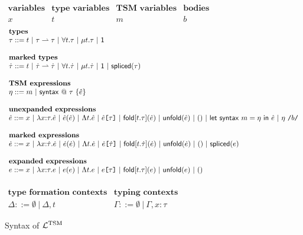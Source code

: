 \begin{figure}$\begin{array}{llllll}
\textbf{variables} & \textbf{type variables} & \textbf{TSM variables} & \textbf{bodies}\\
x & t & m & b\\~\end{array}$\\
$\begin{array}{l}
\textbf{types}\\
\tau ::= t ~\vert~ \parr{\tau}{\tau} ~\vert~ \forallt{t}{\tau} ~\vert~ \rect{t}{\tau} ~\vert~ \unitt\\
~\\
\textbf{marked types}\\
\mtau ::= t ~\vert~ \parr{\mtau}{\mtau} ~\vert~ \forallt{t}{\mtau} ~\vert~ \rect{t}{\mtau} ~\vert~ \unitt ~\vert~ \mtspliced{\tau}\\
~\\
\textbf{TSM expressions}\\
\tsme ::= \tsmv ~\vert~ \utsmdef{\tau}{\ue}
\\~\\
\textbf{unexpanded expressions}\\
\ue ::= {x} ~\vert~ \lam{x}{\tau}{\ue} ~\vert~ \ue(\ue) ~\vert~ \Lam{t}{\ue} ~\vert~ \App{\ue}{\tau} ~\vert~ \fold{t}{\tau}{\ue} ~\vert~ \unfold{\ue} ~\vert~ \triv ~\vert~ \uletsyntax{\tsmv}{\tsme}{\ue} ~\vert~ \utsmapp{\eta}{b}
\\~\\
\textbf{marked expressions}\\
\me ::= x ~\vert~ \lam{x}{\mtau}{\me} ~\vert~ \app{\me}{\me} ~\vert~ \Lam{t}{\me} ~|~ \App{\me}{\mtau} ~\vert~ \fold{t}{\mtau}{\me} ~\vert~ \unfold{\me} ~\vert~ \triv ~\vert~ \mspliced{e}
\\~\\
\textbf{expanded expressions}\\
e ::= x ~\vert~ \lam{x}{\tau}{e} ~\vert~ \app{e}{e} ~\vert~ \Lam{t}{e} ~\vert~ \App{e}{\tau} ~\vert~ \fold{t}{\tau}{e} ~\vert~ \unfold{e} ~\vert~ \triv\end{array}\\\vspace{8px}$
~\\
$\begin{array}{ll}
\textbf{type formation contexts} & \textbf{typing contexts}\\
\Delta ::= \emptyset ~\vert~ \Delta, t & \Gamma ::= \emptyset ~\vert~ \Gamma, x : \tau
\end{array}$
\caption{Syntax of $\mathcal{L}^\text{TSM}$}
\label{fig:lambda-tsm-syntax}
\end{figure}


